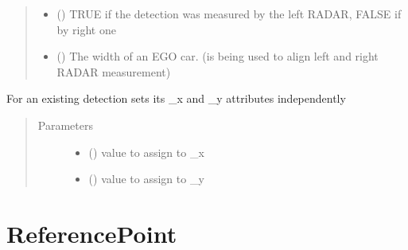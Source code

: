 \documentclass[letterpaper,10pt,english]{sphinxmanual}
\begin{document}
\begin{fulllineitems}
\begin{quote}
\begin{description}
\begin{itemize}
\item {} 
 () \textendash{} TRUE if the detection was measured by the left RADAR, FALSE if by right one

\item {} 
 () \textendash{} The width of an EGO car. (is being used to align left and right RADAR measurement)

\end{itemize}

\end{description}\end{quote}

\begin{fulllineitems}
\label{\detokenize{datacontainers:data_containers.DetectionPoint.set_XY}}
For an existing detection sets its \_x and \_y attributes independently
\begin{quote}\begin{description}
\item[{Parameters}] \leavevmode\begin{itemize}
\item {} 
 () \textendash{} value to assign to \_x

\item {} 
 () \textendash{} value to assign to \_y

\end{itemize}

\end{description}\end{quote}

\end{fulllineitems}


\end{fulllineitems}



\section{ReferencePoint}
\label{\detokenize{datacontainers:referencepoint}}
\end{document}
